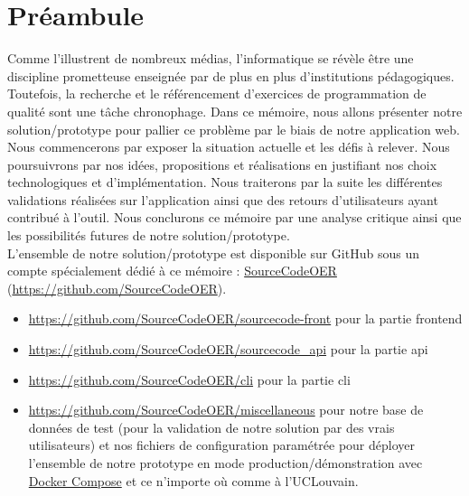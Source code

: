 \chapter*{Préambule}


Comme l'illustrent de nombreux médias, l'informatique se révèle être une discipline prometteuse enseignée par de plus en plus d'institutions pédagogiques. Toutefois, la recherche et le référencement d'exercices de programmation de qualité sont une tâche chronophage.
Dans ce mémoire, nous allons présenter notre solution/prototype pour pallier ce problème par le biais de notre application web. Nous commencerons par exposer la situation actuelle et les défis à relever. Nous poursuivrons par nos idées, propositions et réalisations en justifiant nos choix technologiques et d'implémentation. Nous traiterons par la suite les différentes validations réalisées sur l'application ainsi que des retours d'utilisateurs ayant contribué à l'outil. Nous conclurons ce mémoire par une analyse critique ainsi que les possibilités futures de notre solution/prototype. \\

L'ensemble de notre solution/prototype est disponible sur GitHub sous un compte spécialement dédié à ce mémoire : 
\href{https://github.com/SourceCodeOER}{SourceCodeOER} (\href{https://github.com/SourceCodeOER}{https://github.com/SourceCodeOER}).

\begin{itemize}
    \item \href{https://github.com/SourceCodeOER/sourcecode-front}{https://github.com/SourceCodeOER/sourcecode-front} pour la partie \Gls{frontend}
    \item \href{https://github.com/SourceCodeOER/sourcecode\_api}{https://github.com/SourceCodeOER/sourcecode\_api} pour la partie \Gls{api}
    \item \href{https://github.com/SourceCodeOER/cli}{https://github.com/SourceCodeOER/cli} pour la partie \Gls{cli}
    \item \href{https://github.com/SourceCodeOER/miscellaneous}{https://github.com/SourceCodeOER/miscellaneous} pour notre base de données de test (pour la validation de notre solution par des vrais utilisateurs) et nos fichiers de configuration paramétrée pour déployer l'ensemble de notre prototype en mode production/démonstration avec \href{https://docs.docker.com/compose/}{Docker Compose} et ce n'importe où comme à l'UCLouvain.
\end{itemize}

